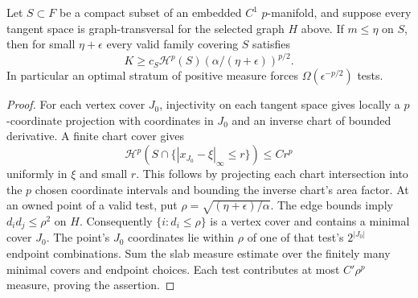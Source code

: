 \begin{proposition}\label{geom:prop-curved-graph}
Let $S\subset F$ be a compact subset of an embedded $C^1$
$p$-manifold, and suppose every tangent space is graph-transversal for
the selected graph $H$ above. If $m\leq\eta$ on $S$, then for small
$\eta+\epsilon$ every valid family covering $S$ satisfies
\[
 K\geq c_S\mathcal H^p(S)
                           (\alpha/(\eta+\epsilon))^{p/2}.
\]
In particular an optimal stratum of positive measure forces
$\Omega(\epsilon^{-p/2})$ tests.
\end{proposition}
\begin{proof}
For each vertex cover $J_0$, injectivity on each tangent space gives
locally a $p$-coordinate projection with coordinates in $J_0$ and an
inverse chart of bounded derivative. A finite chart cover gives
\[
 \mathcal H^p(S\cap\{|x_{J_0}-\xi|_\infty\leq r\})\leq Cr^p
\]
uniformly in $\xi$ and small $r$. This follows by projecting each chart
intersection into the $p$ chosen coordinate intervals and bounding
the inverse chart's area factor.
At an owned point of a valid test, put
$\rho=\sqrt{(\eta+\epsilon)/\alpha}$. The edge bounds imply
$d_i d_j\leq\rho^2$ on $H$. Consequently $\{i:d_i\leq\rho\}$ is
a vertex cover and contains a minimal cover $J_0$. The point's
$J_0$ coordinates lie within $\rho$ of one of that test's
$2^{|J_0|}$ endpoint combinations. Sum the slab measure estimate over
the finitely many minimal covers and endpoint choices. Each test
contributes at most $C'\rho^p$ measure, proving the assertion.
\end{proof}

